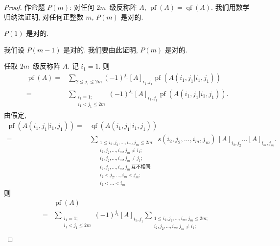 \documentclass[../libro.tex]{subfiles}
\begin{document}
\begin{proof}
    作命题 \(P(m)\):
    对任何 \(2m\)~级反称阵 \(A\),
    \(\operatorname{pf} {(A)} = \operatorname{qf} {(A)}\).
    我们用数学归纳法证明,
    对任何正整数 \(m\),
    \(P(m)\) 是对的.

    \(P(1)\) 是对的.

    我们设 \(P(m-1)\) 是对的.
    我们要由此证明, \(P(m)\) 是对的.

    任取 \(2m\)~级反称阵 \(A\).
    记 \(i_1 = 1\).
    则
    \begin{align*}
        \operatorname{pf} {(A)}
        = {} &
        \sum_{2 \leq j_1 \leq 2m}
        {(-1)^{j_1} [A]_{i_1,j_1}
        \operatorname{pf} {(A({i_1,j_1}|{i_1,j_1}))}}
        \\
        = {} &
        \sum_{\substack{
                i_1 = 1; \\
                i_1 < j_1 \leq 2m
        }}
        {(-1)^{j_1} [A]_{i_1,j_1}
        \operatorname{pf} {(A({i_1,j_1}|{i_1,j_1}))}}.
    \end{align*}
    由假定,
    \begin{align*}
        \operatorname{pf} {(A({i_1,j_1}|{i_1,j_1}))}
        = {} &
        \operatorname{qf} {(A({i_1,j_1}|{i_1,j_1}))}
        \\
        = {} &
        \sum_{\substack{
                1 \leq i_2, j_2, \dots, i_m, j_m \leq 2m;   \\
                i_2, j_2, \dots, i_m, j_m \neq i_1;         \\
                i_2, j_2, \dots, i_m, j_m \neq j_1;         \\
                i_2, j_2, \dots, i_m, j_m\,\text{互不相同}; \\
                i_2 < j_2, \dots, i_m < j_m;                \\
                i_2 < \dots < i_m
        }}
        {s(i_2, j_2, \dots, i_m, j_m)\,
        [A]_{i_2,j_2} \dots [A]_{i_m,j_m}}.
    \end{align*}
    则
    \begin{align*}
        &
        \operatorname{pf} {(A)}
        \\
        = {} &
        \sum_{\substack{
                i_1 = 1; \\
                i_1 < j_1 \leq 2m
        }}
        (-1)^{j_1} [A]_{i_1,j_1}
        \sum_{\substack{
                1 \leq i_2, j_2, \dots, i_m, j_m \leq 2m;   \\
                i_2, j_2, \dots, i_m, j_m \neq i_1;         \\
}}
\end{align*}
\end{proof}
\end{document}
